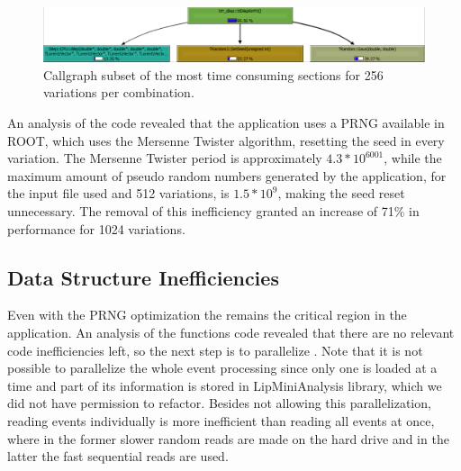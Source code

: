 \begin{figure}[!htp]
	\begin{center}
		\includegraphics[scale=0.33]{images/prng_256.png}
		\caption{Callgraph subset of the \ttDilepKinFit most time consuming sections for 256 variations per combination.}
		\label{fig:prng256}
	\end{center}
\end{figure}

An analysis of the code revealed that the application uses a PRNG available in ROOT, which uses the Mersenne Twister algorithm, resetting the seed in every variation. The Mersenne Twister period is approximately $4.3 * 10^{6001}$, while the maximum amount of pseudo random numbers generated by the application, for the input file used and 512 variations, is $1.5 * 10^9$, making the seed reset unnecessary. The removal of this inefficiency granted an increase of 71\% in performance for 1024 variations.


\subsection{Data Structure Inefficiencies}
\label{data_inef}

Even with the PRNG optimization the \ttDilepKinFit remains the critical region in the application. An analysis of the functions code revealed that there are no relevant code inefficiencies left, so the next step is to parallelize \ttDilepKinFit. Note that it is not possible to parallelize the whole event processing since only one is loaded at a time and part of its information is stored in LipMiniAnalysis library, which we did not have permission to refactor. Besides not allowing this parallelization, reading events individually is more inefficient than reading all events at once, where in the former slower random reads are made on the hard drive and in the latter the fast sequential reads are used.

